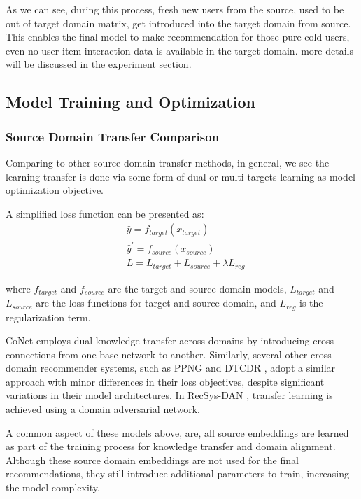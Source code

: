 As we can see, during this process, fresh new users from the source, used to be out of target domain matrix, get introduced into the target domain from source. This enables the final model to make recommendation for those pure cold users, even no user-item interaction data is available in the target domain.
more details will be discussed in the experiment section.


\subsection{Model Training and Optimization}

\subsubsection{Source Domain Transfer Comparison}
Comparing to other source domain transfer methods, in general, we see the learning transfer is done via some form of dual or multi targets learning as model optimization objective.

A simplified loss function can be presented as:
\begin{equation}
    \begin{aligned}
        &\hat{y} = f_{target}(x_{target}) \\
        &\hat{y}^{'} = f_{source}(x_{source}) \\
        &L = L_{target} + L_{source} + \lambda L_{reg}
    \end{aligned}
\end{equation}

where $f_{target}$ and $f_{source}$ are the target and source domain models, $L_{target}$ and $L_{source}$ are the loss functions for target and source domain, and $L_{reg}$ is the regularization term.

CoNet \cite{Hu_2018} employs dual knowledge transfer across domains by introducing cross connections from one base network to another. Similarly, several other cross-domain recommender systems, such as PPNG \cite{zhao2019cross} and DTCDR \cite{DTCDR2019zhu}, adopt a similar approach with minor differences in their loss objectives, despite significant variations in their model architectures. In RecSys-DAN \cite{wang2019recsys}, transfer learning is achieved using a domain adversarial network.

A common aspect of these models above, are, all source embeddings are learned as part of the training process for knowledge transfer and domain alignment. Although these source domain embeddings are not used for the final recommendations, they still introduce additional parameters to train, increasing the model complexity.

